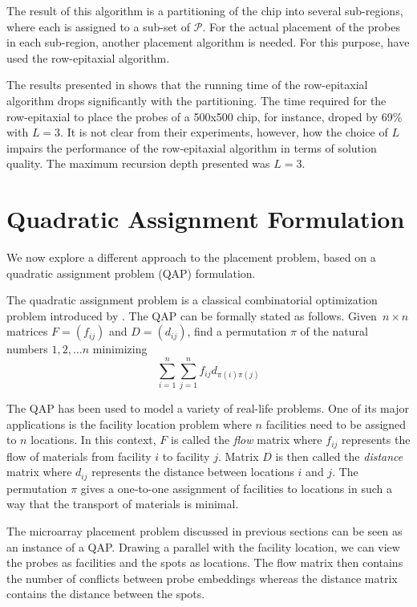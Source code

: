 \documentclass{bioinfo}
\begin{document}
The result of this algorithm is a partitioning of the chip into several sub-regions, where each is assigned to a sub-set of $\mathcal{P}$. For the actual placement of the probes in each sub-region, another placement algorithm is needed. For this purpose, \citealp{KAHNG03_1} have used the row-epitaxial algorithm.

The results presented in \citealp{KAHNG03_1} shows that the running time of the row-epitaxial algorithm drops significantly with the partitioning. The time required for the row-epitaxial to place the probes of a 500x500 chip, for instance, droped by 69\% with $L = 3$. It is not clear from their experiments, however, how the choice of $L$ impairs the performance of the row-epitaxial algorithm in terms of solution quality. The maximum recursion depth presented was $L = 3$.

\section{Quadratic Assignment Formulation}

We now explore a different approach to the placement problem, based on a quadratic assignment problem (QAP) formulation.

The quadratic assignment problem is a classical combinatorial optimization problem introduced by \citealp{KOOPMANS57}. The QAP can be formally stated as follows. Given~$n \times n$ matrices $F = (f_{ij})$ and $D = (d_{ij})$, find a permutation $\pi$ of the natural numbers $1, 2, \ldots n$ minimizing
\begin{equation}
\label{eq:qap_def} \sum_{i=1}^{n} \sum_{j=1}^{n} f_{ij} d_{\pi(i)\pi(j)}
\end{equation}

The QAP has been used to model a variety of real-life problems. One of its major applications is the facility location problem where $n$ facilities need to be assigned to $n$ locations. In this context, $F$ is called the \emph{flow} matrix where $f_{ij}$ represents the flow of materials from facility $i$ to facility $j$. Matrix $D$ is then called the \emph{distance} matrix where $d_{ij}$ represents the distance between locations $i$ and $j$. The permutation $\pi$ gives a one-to-one assignment of facilities to locations in such a way that the transport of materials is minimal.

The microarray placement problem discussed in previous sections can be seen as an instance of a QAP. Drawing a parallel with the facility location, we can view the probes as facilities and the spots as locations. The flow matrix then contains the number of conflicts between probe embeddings whereas the distance matrix contains the distance between the spots.
\end{document}
